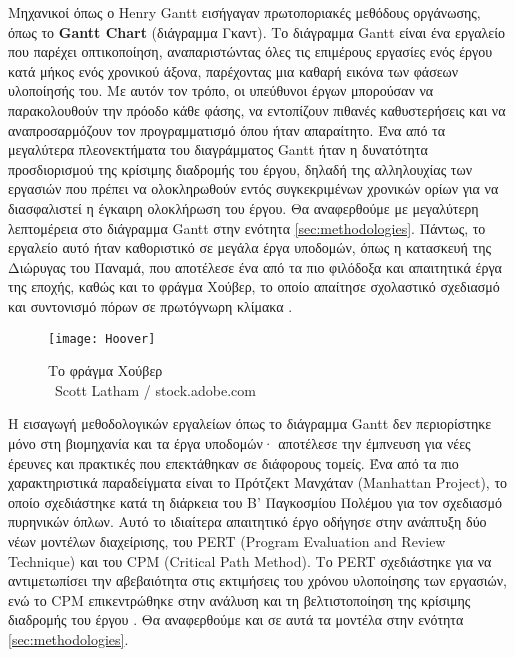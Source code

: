             Μηχανικοί όπως ο Henry Gantt εισήγαγαν πρωτοποριακές μεθόδους οργάνωσης, όπως το \textbf{Gantt Chart} (διάγραμμα Γκαντ). Το διάγραμμα Gantt είναι ένα εργαλείο που παρέχει οπτικοποίηση, αναπαριστώντας όλες τις επιμέρους εργασίες ενός έργου κατά μήκος ενός χρονικού άξονα, παρέχοντας μια καθαρή εικόνα των φάσεων υλοποίησής του. Με αυτόν τον τρόπο, οι υπεύθυνοι έργων μπορούσαν να παρακολουθούν την πρόοδο κάθε φάσης, να εντοπίζουν πιθανές καθυστερήσεις και να αναπροσαρμόζουν τον προγραμματισμό όπου ήταν απαραίτητο. Ένα από τα μεγαλύτερα πλεονεκτήματα του διαγράμματος Gantt ήταν η δυνατότητα προσδιορισμού της κρίσιμης διαδρομής του έργου, δηλαδή της αλληλουχίας των εργασιών που πρέπει να ολοκληρωθούν εντός συγκεκριμένων χρονικών ορίων για να διασφαλιστεί η έγκαιρη ολοκλήρωση του έργου. Θα αναφερθούμε με μεγαλύτερη λεπτομέρεια στο διάγραμμα Gantt στην ενότητα \ref{sec:methodologies}. Πάντως, το εργαλείο αυτό ήταν καθοριστικό σε μεγάλα έργα υποδομών, όπως η κατασκευή της Διώρυγας του Παναμά, που αποτέλεσε ένα από τα πιο φιλόδοξα και απαιτητικά έργα της εποχής, καθώς και το φράγμα Χούβερ, το οποίο απαίτησε σχολαστικό σχεδιασμό και συντονισμό πόρων σε πρωτόγνωρη κλίμακα \cite{strefapmiHooverGreatest}.

            \begin{figure}[h!] \noindent \centering
                \texttt{[image: Hoover]}
                \caption{\centering Το φράγμα Χούβερ \cite{britannicaHoover} \\ {\footnotesize \textcopyright\ Scott Latham / stock.adobe.com}}
            \end{figure}

            Η εισαγωγή μεθοδολογικών εργαλείων όπως το διάγραμμα Gantt δεν περιορίστηκε μόνο στη βιομηχανία και τα έργα υποδομών· αποτέλεσε την έμπνευση για νέες έρευνες και πρακτικές που επεκτάθηκαν σε διάφορους τομείς. Ένα από τα πιο χαρακτηριστικά παραδείγματα είναι το Πρότζεκτ Μανχάταν (Manhattan Project), το οποίο σχεδιάστηκε κατά τη διάρκεια του Β' Παγκοσμίου Πολέμου για τον σχεδιασμό πυρηνικών όπλων. Αυτό το ιδιαίτερα απαιτητικό έργο οδήγησε στην ανάπτυξη δύο νέων μοντέλων διαχείρισης, του PERT (Program Evaluation and Review Technique) και του CPM (Critical Path Method). Το PERT σχεδιάστηκε για να αντιμετωπίσει την αβεβαιότητα στις εκτιμήσεις του χρόνου υλοποίησης των εργασιών, ενώ το CPM επικεντρώθηκε στην ανάλυση και τη βελτιστοποίηση της κρίσιμης διαδρομής του έργου \cite{SaylorAcademyProjectManagement}. Θα αναφερθούμε και σε αυτά τα μοντέλα στην ενότητα \ref{sec:methodologies}.


